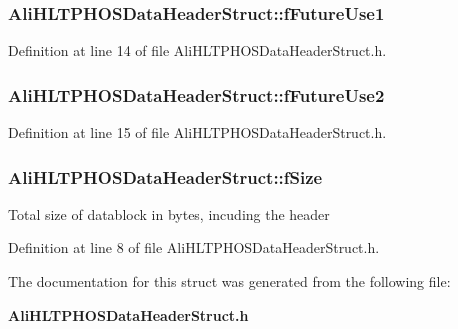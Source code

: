 \subsubsection{ {\bf Ali\-HLTPHOSData\-Header\-Struct::f\-Future\-Use1}}\label{structAliHLTPHOSDataHeaderStruct_o6}




Definition at line 14 of file Ali\-HLTPHOSData\-Header\-Struct.h.
\subsubsection{ {\bf Ali\-HLTPHOSData\-Header\-Struct::f\-Future\-Use2}}\label{structAliHLTPHOSDataHeaderStruct_o7}




Definition at line 15 of file Ali\-HLTPHOSData\-Header\-Struct.h.
\subsubsection{ {\bf Ali\-HLTPHOSData\-Header\-Struct::f\-Size}}\label{structAliHLTPHOSDataHeaderStruct_o0}


Total size of datablock in bytes, incuding the header 

Definition at line 8 of file Ali\-HLTPHOSData\-Header\-Struct.h.

The documentation for this struct was generated from the following file:\begin{CompactItemize}
\item 
{\bf Ali\-HLTPHOSData\-Header\-Struct.h}\end{CompactItemize}
